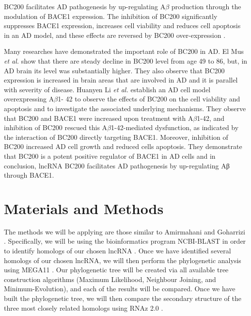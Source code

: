 \documentclass[conference]{IEEEtran}
\begin{document}
BC200 facilitates AD pathogenesis by up-regulating A$\beta$ production through the modulation of BACE1 expression. 
The inhibition of BC200 significantly suppresses BACE1 expression, increases cell viability and reduces cell apoptosis in an AD model, and these effects are reversed by BC200 over-expression \cite{li2018identification,zhang2021role}.

Many researches have demonstrated the important role of BC200 in AD. 
El Mus \emph{et al.} \cite{mus2007dendritic} show that there are steady decline in BC200 level from age 49 to 86, but, in AD brain its level was substantially higher. 
They also observe that BC200 expression is increased in brain areas that are involved in AD and it is parallel with severity of disease. 
Huanyen Li \emph{et al.} \cite{li2018identification} establish an AD cell model overexpressing A$\beta$1- 42 to observe the effects of BC200 on the cell viability and apoptosis and to investigate the associated underlying mechanisms. 
They observe that BC200 and BACE1 were increased upon treatment with A$\beta$1-42, and inhibition of BC200 rescued this A$\beta$1-42-mediated dysfunction, as indicated by the interaction of BC200 directly targeting BACE1. 
Moreover, inhibition of BC200 increased AD cell growth and reduced cells apoptosis. 
They demonstrate that BC200 is a potent positive regulator of BACE1 in AD cells and in conclusion, lncRNA BC200 facilitates AD pathogenesis by up-regulating Aβ through BACE1.  					 			 		 	 

\section{Materials and Methods}\label{sec:methods}

The methods we will be applying are those similar to Amirmahani and Goharrizi \cite{amirmahani2018phylogenetic}. 
Specifically, we will be using the bioinformatics program NCBI-BLAST in order to identify homologs of our chosen lncRNA \cite{madden2012blast,blastTool}. 
Once we have identified several homologs of our chosen lncRNA, we will then perform the phylogenetic analysis using MEGA11 \cite{tamura2021mega11}. 
Our phylogenetic tree will be created via all available tree construction algorithms (Maximum Likelihood, Neighbour Joining, and Minimum-Evolution), and each of the results will be compared. 
Once we have built the phylogenetic tree, we will then compare the secondary structure of the three most closely related homologs using RNAz 2.0 \cite{gruber2010rnaz}.
\end{document}
